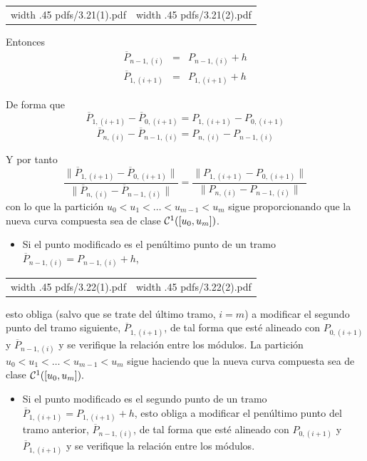 \documentclass[twoside]{report}
\newcommand{\colocapdf}[2]{\quad\pdfimage width #2 {pdfs/#1.pdf}}
\begin{document}
\begin{center}
\begin{tabular}{cc}
\colocapdf{3.21(1)}{.45\textwidth} &
\colocapdf{3.21(2)}{.45\textwidth}
\end{tabular}
\end{center}


Entonces $$\begin{array}{rcl} \overline{P}_{n-1, (i)}&=&P_{n-1, (i)}+h\\ \overline{P}_{1, (i+1)}&=&P_{1, (i+1)}+h \end{array}$$

De forma que
$$\overline{P}_{1, (i+1)}-\overline{P}_{0, (i+1)}=P_{1, (i+1)}-P_{0, (i+1)}$$
$$\overline{P}_{n, (i)}-\overline{P}_{n-1, (i)}=P_{n, (i)}-P_{n-1, (i)}$$

Y por tanto
$$\frac{\parallel \overline{P}_{1,(i+1)}-\overline{P}_{0,(i+1)}\parallel}{\parallel \overline{P}_{n, (i)}-\overline{P}_{n-1,(i)} \parallel}=\frac{\parallel P_{1,(i+1)}-P_{0,(i+1)}\parallel}{\parallel P_{n, (i)}-P_{n-1,(i)} \parallel}$$
con lo que la partición $u_0<u_1<\ldots<u_{m-1}<u_m$ sigue proporcionando que la nueva curva compuesta sea de clase ${\cal C}^1([u_0,u_m])$.

\begin{itemize}
\item Si el punto modificado es el penúltimo punto de un tramo $\overline{P}_{n-1,(i)}=P_{n-1,(i)}+h$,
\end{itemize}

\begin{center}
\begin{tabular}{cc}
\colocapdf{3.22(1)}{.45\textwidth} &
\colocapdf{3.22(2)}{.45\textwidth}
\end{tabular}
\end{center}

esto obliga (salvo que se trate del último tramo, $i=m$) a modificar el segundo punto del tramo siguiente, $\overline{P}_{1,(i+1)}$, de tal forma que esté alineado con $P_{0,(i+1)}$ y $\overline{P}_{n-1,(i)}$  y se verifique la relación entre los módulos.
La partición $u_0<u_1<\ldots<u_{m-1}<u_m$ sigue haciendo que la nueva curva compuesta sea de clase ${\cal C}^1([u_0,u_m]).$

\begin{itemize}
\item Si el punto modificado es el segundo punto de un tramo $\overline{P}_{1,(i+1)}=P_{1,(i+1)}+h$, esto obliga a modificar el penúltimo punto del tramo anterior, $\overline{P}_{n-1,(i)}$, de tal forma que esté alineado con $P_{0,(i+1)}$ y $\overline{P}_{1,(i+1)}$  y se verifique la relación entre los módulos.
\end{itemize}
\end{document}
